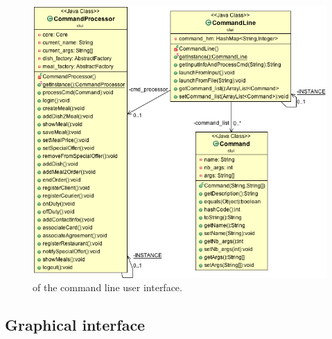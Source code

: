 \begin{figure}
  \begin{center}
    \includegraphics[scale=0.5]{./img/CLUI.png}
    \end{center}
  \caption{\umld of the command line user interface.}
  \label{fig:clui_uml}
\end{figure}


\subsection{Graphical interface} %
\label{sub:graphical_interface}

